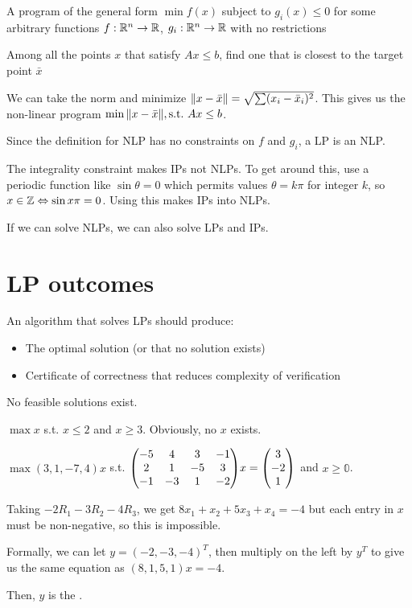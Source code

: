 \begin{defn}
  A program of the general form $\min f(x)$ subject to $g_i(x) \leq 0$ for some arbitrary functions $f : \mathbb{R}^n \to \mathbb{R}$, $g_i : \mathbb{R}^n \to \mathbb{R}$ with no restrictions
\end{defn}
\begin{example}
  Among all the points $x$ that satisfy $Ax \leq b$, find one that is closest to the target point $\bar x$
\end{example}
\begin{sol}
  We can take the norm and minimize $\norm{x - \bar x} = \sqrt{\sum(x_i-\bar x_i)^2}$.
  This gives us the non-linear program $\min \norm{x - \bar x}, \text{s.t.\ } Ax \leq b$.
\end{sol}

Since the definition for NLP has no constraints on $f$ and $g_i$, a LP is an NLP.

The integrality constraint makes IPs not NLPs.
To get around this, use a periodic function like $\sin \theta = 0$ which permits values $\theta = k\pi$ for integer $k$, so $x \in \mathbb{Z} \Leftrightarrow \sin x\pi  = 0$.
Using this makes IPs into NLPs.

If we can solve NLPs, we can also solve LPs and IPs.

\section{LP outcomes}

An algorithm that solves LPs should produce:
\begin{itemize}[nosep]
  \item The optimal solution (or that no solution exists)
  \item Certificate of correctness that reduces complexity of verification
\end{itemize}

\begin{defn}[infeasibility]
  No feasible solutions exist.
\end{defn}

\begin{example}
  $\max x$ s.t. $x \leq 2$ and $x \geq 3$. Obviously, no $x$ exists.
\end{example}

\begin{example}
  $\max{(3,1,-7,4)x}$ s.t. $\mqty(-5&4&3&-1\\2&1&-5&3\\-1&-3&1&-2)x = \mqty(3\\-2\\1)$ and $x \geq \mathbb{0}$.

  Taking $-2R_1 - 3R_2 - 4R_3$, we get $8x_1+x_2+5x_3+x_4 = -4$ but each entry in $x$ must be non-negative, so this is impossible.

  Formally, we can let $y = (-2,-3,-4)^T$, then multiply on the left by $y^T$ to give us the same equation as $(8,1,5,1)x = -4$.

  Then, $y$ is the .
\end{example}

